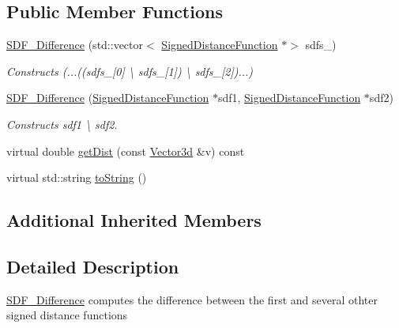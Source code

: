 \subsection*{Public Member Functions}
\begin{DoxyCompactItemize}
\item 
\mbox{\label{classCPlantBox_1_1SDF__Difference_aac3fb5f4f529966bfa15871dcffd70ce}} 
\hyperlink{classCPlantBox_1_1SDF__Difference_aac3fb5f4f529966bfa15871dcffd70ce}{S\+D\+F\+\_\+\+Difference} (std\+::vector$<$ \hyperlink{classCPlantBox_1_1SignedDistanceFunction}{Signed\+Distance\+Function} $\ast$$>$ sdfs\+\_\+)
\begin{DoxyCompactList}\small\item\em Constructs (...((sdfs\+\_\+\mbox{[}0\mbox{]} \textbackslash{} sdfs\+\_\+\mbox{[}1\mbox{]}) \textbackslash{} sdfs\+\_\+\mbox{[}2\mbox{]})...) \end{DoxyCompactList}\item 
\mbox{\label{classCPlantBox_1_1SDF__Difference_acf2e6dce46a28bd28aa749d34ff09729}} 
\hyperlink{classCPlantBox_1_1SDF__Difference_acf2e6dce46a28bd28aa749d34ff09729}{S\+D\+F\+\_\+\+Difference} (\hyperlink{classCPlantBox_1_1SignedDistanceFunction}{Signed\+Distance\+Function} $\ast$sdf1, \hyperlink{classCPlantBox_1_1SignedDistanceFunction}{Signed\+Distance\+Function} $\ast$sdf2)
\begin{DoxyCompactList}\small\item\em Constructs sdf1 \textbackslash{} sdf2. \end{DoxyCompactList}\item 
virtual double \hyperlink{classCPlantBox_1_1SDF__Difference_a3026bc983827af9842f32b1f72808ac1}{get\+Dist} (const \hyperlink{classCPlantBox_1_1Vector3d}{Vector3d} \&v) const
\item 
virtual std\+::string \hyperlink{classCPlantBox_1_1SDF__Difference_a63fc8597ea841a973ab29d7aa6cea3ca}{to\+String} ()
\end{DoxyCompactItemize}
\subsection*{Additional Inherited Members}


\subsection{Detailed Description}
\hyperlink{classCPlantBox_1_1SDF__Difference}{S\+D\+F\+\_\+\+Difference} computes the difference between the first and several othter signed distance functions 

